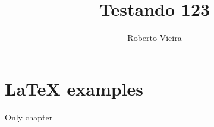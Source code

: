 \documentclass{article}
\title{Testando 123}
\author{Roberto Vieira}
\begin{document}
\chapter{LaTeX examples}

Only chapter
\end{document}
